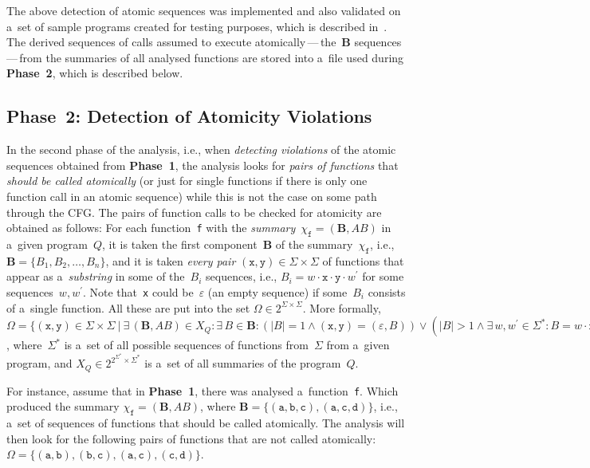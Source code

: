 The above detection of atomic sequences was implemented and also validated
on a~set of sample programs created for testing purposes, which is described
in~\cite{harmimBP}. The derived sequences of calls assumed to execute
atomically\,---\,the~$ \boldsymbol{B} $ sequences\,---\,from the summaries
of all analysed functions are stored into a~file used during \textbf{Phase~2},
which is described below.

\subsection{Phase~2: Detection of Atomicity Violations}

In the second phase of the analysis, i.e., when \emph{detecting violations}
of the atomic sequences obtained from \textbf{Phase~1}, the analysis looks
for \emph{pairs of functions} that \emph{should be called atomically} (or
just for single functions if there is only one function call in an atomic
sequence) while this is not the case on some path through the CFG. The
pairs of function calls to be checked for atomicity are obtained as
follows: For each function~\texttt{f} with the
\emph{summary}~$ \chi_\mathtt{f} = {(\boldsymbol{B}, AB)} $ in a~given
program~$ Q $, it is taken the first component~$ \boldsymbol{B} $ of the
summary~$ \chi_\mathtt{f} $, i.e., $ \boldsymbol{B} = {\{B_1, B_2,
\ldots, B_n\}} $, and it is taken \emph{every pair} $ {(\mathtt{x},
\mathtt{y})} \in \Sigma \times \Sigma $ of functions that appear as
a~\emph{substring} in some of the~$ B_i $ sequences, i.e., $ B_i = w \cdot
\mathtt{x} \cdot \mathtt{y} \cdot w^\prime $ for some sequences~$ w,
w^\prime $. Note that~\texttt{x} could be~$ \varepsilon $ (an empty
sequence) if some~$ B_i $ consists of a~single function. All these
 are put into the set $ \Omega \in 2^{\Sigma \times
\Sigma} $. More formally, $ \Omega = \{(\mathtt{x}, \mathtt{y}) \in
\Sigma \times \Sigma\ |\ \exists\,{(\boldsymbol{B}, AB)} \in X_Q :
\exists\,B \in \boldsymbol{B} : (|B| = 1 \wedge {(\mathtt{x}, \mathtt{y})}
= {(\varepsilon, B)}) \vee (|B| > 1 \wedge \exists\,w, w^\prime \in
\Sigma^* : B = w \cdot \mathtt{x} \cdot \mathtt{y} \cdot w^\prime \wedge
{(\mathtt{x}, \mathtt{y})} \neq {(\varepsilon, \varepsilon)})\} $,
where~$ \Sigma^* $ is a~set of all possible sequences of functions
from~$ \Sigma $ from a~given program, and $ X_Q \in 2^{2^{\Sigma^*}
\times \Sigma^*} $ is a~set of all summaries of the program~$ Q $.

\begin{example}
    For instance, assume that in \textbf{Phase~1}, there was analysed
    a~function~\texttt{f}. Which produced the summary
    $ \chi_\mathtt{f} = (\boldsymbol{B}, AB) $, where
    $ \boldsymbol{B} = \{{(\mathtt{a}, \mathtt{b}, \mathtt{c})},
    {(\mathtt{a}, \mathtt{c}, \mathtt{d})\}} $, i.e., a~set of
    sequences of functions that should be called atomically. The
    analysis will then look for the following pairs of functions that
    are not called atomically: $ \Omega = \{{(\mathtt{a}, \mathtt{b})},
    {(\mathtt{b}, \mathtt{c})}, {(\mathtt{a}, \mathtt{c})},
    {(\mathtt{c}, \mathtt{d})}\} $.
\end{example}

